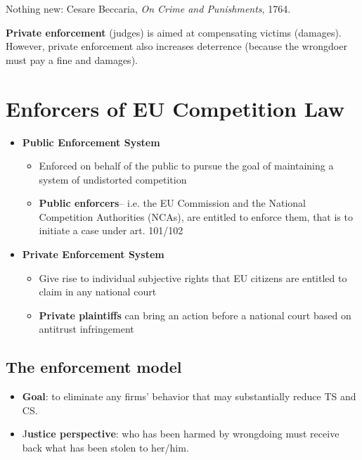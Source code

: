     Nothing new: Cesare Beccaria,\textit{ On Crime and Punishments}, 1764.

    \noindent
    \textbf{Private enforcement} (judges) is aimed at compensating victims (damages). However, private enforcement also increases deterrence (because the wrongdoer must pay a fine and damages).

    \newpage
\section{Enforcers of EU Competition Law}

        \begin{itemize}
            \item \textbf{Public Enforcement System}
                \begin{itemize}
                    \item Enforced on behalf of the public to pursue the goal of maintaining a system of undistorted competition
                    \item \textbf{Public enforcers}– i.e. the EU Commission and the National Competition Authorities (NCAs), are entitled to enforce them, that is to initiate a case under art. 101/102
                \end{itemize}
            \item \textbf{Private Enforcement System}
                \begin{itemize}
                    \item Give rise to individual subjective rights that EU citizens are entitled to claim in any national court
                    \item \textbf{Private plaintiffs} can bring an action before a national court based on antitrust infringement
                \end{itemize}
        \end{itemize}

    \subsection{The enforcement model}
    
        \begin{itemize}
            \item \textbf{Goal}: to eliminate any firms’ behavior that may substantially reduce TS and CS.
            \item J\textbf{ustice perspective}: who has been harmed by wrongdoing must receive back what has been stolen to her/him.
        \end{itemize}
    
